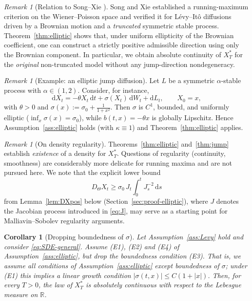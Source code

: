 \documentclass[11pt]{article}
\newcommand{\R}{\mathbb{R}}
\newcommand{\1}{\mathbf{1}}
\newcommand{\dd}{\mathrm{d}}
\newcommand{\Xstar}{X^{\ast}}
\theoremstyle{plain}
\newtheorem{corollary}[theorem]{Corollary}
\theoremstyle{definition}
\theoremstyle{remark}
\newtheorem{remark}[theorem]{Remark}
\begin{document}
\begin{remark}[Relation to Song--Xie \cite{SongXie2018}]
Song and Xie \cite{SongXie2018} established a running-maximum criterion on the Wiener--Poisson space and verified it for
L\'evy--It\^o diffusions driven by a Brownian motion and a \emph{truncated} symmetric stable process.
Theorem~\ref{thm:elliptic} shows that, under uniform ellipticity of the Brownian coefficient, one can construct a strictly positive admissible direction
using only the Brownian component.
In particular, we obtain absolute continuity of $\Xstar_T$ for the \emph{original} non-truncated model without any jump-direction nondegeneracy.
\end{remark}




\begin{remark}[Example: an elliptic jump diffusion]
Let $L$ be a symmetric $\alpha$-stable process with $\alpha\in(1,2)$.
Consider, for instance,
\[
\dd X_t=-\theta X_t\,\dd t+\sigma(X_t)\,\dd W_t+\dd L_t,\qquad X_0=x,
\]
with $\theta>0$ and $\sigma(x):=\sigma_0+\frac{1}{1+x^2}$.
Then $\sigma$ is $C^1$, bounded, and uniformly elliptic ($\inf_x\sigma(x)=\sigma_0$), while $b(t,x)=-\theta x$ is globally Lipschitz.
Hence Assumption~\ref{ass:elliptic} holds (with $\kappa\equiv1$) and Theorem~\ref{thm:elliptic} applies.
\end{remark}

\begin{remark}[On density regularity]
Theorems~\ref{thm:elliptic} and~\ref{thm:jump} establish \emph{existence} of a density for $\Xstar_T$.
Questions of regularity (continuity, smoothness) are considerably more delicate for running maxima and are not pursued here.
We note that the explicit lower bound
\[
D_\Theta X_t\ge \sigma_0\,J_t\int_0^t J_s^{-2}\,\dd s
\]
from Lemma~\ref{lem:DXpos} below (Section~\ref{sec:proof-elliptic}), where $J$ denotes the Jacobian process introduced in \eqref{eq:J}, may serve as a starting point for Malliavin--Sobolev regularity arguments.
\end{remark}

\begin{corollary}[Dropping boundedness of $\sigma$]\label{cor:elliptic-linear}
Let Assumption~\ref{ass:Levy} hold and consider \eqref{eq:SDE-general}.
Assume (E1), (E2) and (E4) of Assumption~\ref{ass:elliptic}, but drop the boundedness condition (E3).
That is, we assume all conditions of Assumption~\ref{ass:elliptic} except boundedness of $\sigma$; under (E1) this implies a linear growth condition $|\sigma(t,x)|\le C(1+|x|)$.
Then, for every $T>0$, the law of $\Xstar_T$ is absolutely continuous with respect to the Lebesgue measure on $\R$.
\end{corollary}
\end{document}
